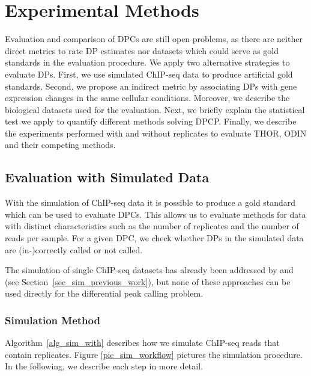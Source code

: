 \chapter{Experimental Methods}
\label{chapter_exp_methods}
Evaluation and comparison of DPCs are still open problems, as there are neither direct metrics to rate DP estimates nor datasets which could serve as gold standards in the evaluation procedure.
We apply two alternative strategies to evaluate DPs.
First, we use simulated ChIP-seq data to produce artificial gold standards.
Second, we propose an indirect metric by associating DPs with gene expression changes in the same cellular conditions.
Moreover, we describe the biological datasets used for the evaluation.
Next, we briefly explain the statistical test we apply to quantify different methods solving DPCP.
Finally, we describe the experiments performed with and without replicates to evaluate THOR, ODIN and their competing methods.

\section{Evaluation with Simulated Data}
With the simulation of ChIP-seq data it is possible to produce a gold standard which can be used to evaluate DPCs.
This allows us to evaluate methods for data with distinct characteristics such as the number of replicates and the number of reads per sample.
For a given DPC, we check whether DPs in the simulated data are (in-)correctly called or not called.

The simulation of single ChIP-seq datasets has already been addressed by \cite{zhang2008} and \cite{humburg2011} (see Section~\ref{sec_sim_previous_work}), but none of these approaches can be used directly for the differential peak calling problem. 

\subsection{Simulation Method}
\label{sec_sim_with_rep}
Algorithm~\ref{alg_sim_with} describes how we simulate ChIP-seq reads that contain replicates.
Figure \ref{pic_sim_workflow} pictures the simulation procedure.
In the following, we describe each step in more detail. 


